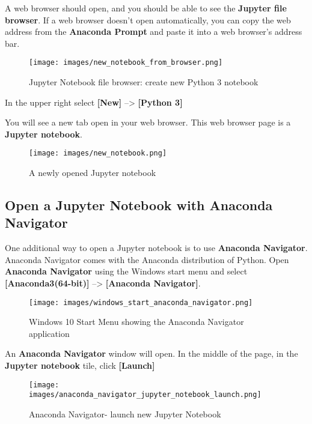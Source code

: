 \documentclass{book}
\makeatletter
\def\maxwidth{\ifdim\Gin@nat@width>\linewidth\linewidth
\else\Gin@nat@width\fi}
\let\Oldincludegraphics\includegraphics
\renewcommand{\includegraphics}[1]{\Oldincludegraphics[width=.8\maxwidth]{#1}}
\makeatother
\begin{document}
A web browser should open, and you should be able to see the
\textbf{Jupyter file browser}. If a web browser doesn't open
automatically, you can copy the web address from the \textbf{Anaconda
Prompt} and paste it into a web browser's address bar.

\begin{figure}
\centering
\texttt{[image: images/new\_notebook\_from\_browser.png]}
\caption{Jupyter Notebook file browser: create new Python 3 notebook}
\end{figure}

In the upper right select \textbf{{[}New{]}} --\textgreater{}
\textbf{{[}Python 3{]}}

You will see a new tab open in your web browser. This web browser page
is a \textbf{Jupyter notebook}.

\begin{figure}
\centering
\texttt{[image: images/new\_notebook.png]}
\caption{A newly opened Jupyter notebook}
\end{figure}
    




    
        \hypertarget{open-a-jupyter-notebook-with-anaconda-navigator}{%
\subsection{Open a Jupyter Notebook with Anaconda
Navigator}\label{open-a-jupyter-notebook-with-anaconda-navigator}}
    




    
        One additional way to open a Jupyter notebook is to use \textbf{Anaconda
Navigator}. Anaconda Navigator comes with the Anaconda distribution of
Python. Open \textbf{Anaconda Navigator} using the Windows start menu
and select \textbf{{[}Anaconda3(64-bit){]}} --\textgreater{}
\textbf{{[}Anaconda Navigator{]}}.

\begin{figure}
\centering
\texttt{[image: images/windows\_start\_anaconda\_navigator.png]}
\caption{Windows 10 Start Menu showing the Anaconda Navigator
application}
\end{figure}

An \textbf{Anaconda Navigator} window will open. In the middle of the
page, in the \textbf{Jupyter notebook} tile, click \textbf{{[}Launch{]}}

\begin{figure}
\centering
\texttt{[image: images/anaconda\_navigator\_jupyter\_notebook\_launch.png]}
\caption{Anaconda Navigator- launch new Jupyter Notebook}
\end{figure}
\end{document}
